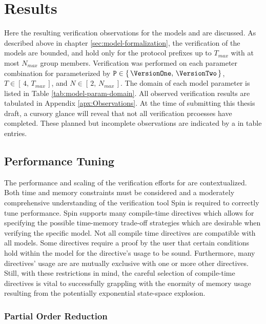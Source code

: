 \hypertarget{results}{%
\chapter{Results}\label{results}}

Here the resulting verification observations for the models \CGKAmod{\VersionOne}{}{} and \CGKAmod{\VersionTwo}{}{} are discussed.
As described above in chapter \ref{sec:model-formalization}, the verification of the models are bounded, and hold only for the protocol prefixes up to \( T_{max} \) with at most \( N_{max }\) group members.
Verification was performed on each parameter combination for  parameterized by \( \mathtt{P} \in \{\, \VersionOne ,\, \VersionTwo \,\} \), \( T \in [\,4,\, T_{max} \,] \), and \( N \in [\,2,\, N_{max} \,] \).
The domain of each  model parameter is listed in Table \ref{tab:model-param-domain}.
All observed verification results are tabulated in Appendix \ref{apx:Observations}.
At the time of submitting this thesis draft, a cursory glance will reveal that not all verification prcoesses have completed.
These planned but incomplete observations are indicated by a \NA in table entries.


\hypertarget{performance-tuning}{%
\section{Performance Tuning}\label{performance-tuning}}

The performance and scaling of the verification efforts for \CGKAmod{}{}{} are contextualized.
Both time and memory constraints must be considered and a moderately comprehensive understanding of the verification tool Spin is required to correctly tune performance.
Spin supports many compile-time directives which allows for specifying the possible time-memory trade-off strategies which are desirable when verifying the specific model.
Not all compile time directives are compatible with all models.
Some directives require a proof by the user that certain conditions hold within the model for the directive's usage to be sound.
Furthermore, many directives' usage are are mutually exclusive with one or more other directives.
Still, with these restrictions in mind, the careful selection of compile-time directives is vital to successfully grappling with the enormity of memory usage resulting from the potentially exponential state-space explosion.


\hypertarget{partial-order-reduction}{%
\subsection{Partial Order Reduction}\label{partial-order-reduction}}

